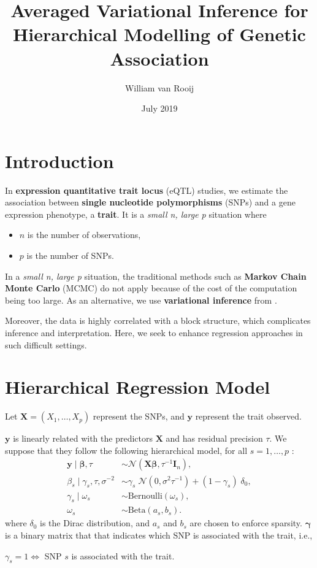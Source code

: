 \documentclass[portrait, a0, 30pt]{sciposter}
\author{William van Rooij}
\title{Averaged Variational Inference for Hierarchical Modelling of Genetic Association}
\date{July 2019}
\institute{École Polytechnique Fédérale de Lausanne, Lausanne, Switzerland}
\begin{document}
\maketitle
\begin{multicols*}{2}
\section{Introduction}
In \textbf{expression quantitative trait locus} (eQTL) studies, we estimate the association between \textbf{single nucleotide polymorphisms} (SNPs) and a gene expression phenotype, a \textbf{trait}. It is a \textit{small n, large p} situation where
\begin{itemize}
\item $n$ is the number of observations,
\item $p$ is the number of SNPs.
\end{itemize}
In a \textit{small n, large p} situation, the traditional methods such as \textbf{Markov Chain Monte Carlo} (MCMC) do not apply because of the cost of the computation being too large. As an alternative, we use \textbf{variational inference} from \citet{varInf}.

Moreover, the data is  highly correlated with a block structure, which complicates inference and interpretation. Here, we seek to enhance regression approaches in such difficult settings.



\section{Hierarchical Regression Model}
Let $\boldsymbol{X} = (X_1,\dots,X_p)$ represent the SNPs, and $\boldsymbol{y}$ represent the trait observed.

$\boldsymbol{y}$ is linearly related with the predictors $\boldsymbol{X}$ and has residual precision $\tau$. We suppose that they follow the following hierarchical model, for all $s = 1,\dots , p$ :
\begin{align*}
\boldsymbol{y} \mid \boldsymbol{\beta}, \tau &\sim\mathcal{N}\left(\boldsymbol{X\beta}, \tau^{-1}\boldsymbol{I}_n\right),\\
\beta_s \mid \gamma_s, \tau, \sigma^{-2} &\sim \gamma_s\;\mathcal{N} \left( 0, \sigma^2 \tau^{-1} \right) + (1-\gamma_s)\;\delta_0,\\
\gamma_s \mid \omega_s &\sim \mathrm{Bernoulli}\left(\omega_s\right),\\
\omega_s &\sim \mathrm{Beta}\left(a_s, b_s\right).
\end{align*}
where $\delta_0$ is the Dirac distribution, and $a_s$ and $b_s$ are chosen to enforce sparsity. $\boldsymbol{\gamma}$ is a binary matrix that that indicates which SNP is associated with the trait, i.e.,
\begin{center}
$\gamma_s = 1 \Longleftrightarrow$ SNP $ s $ is associated with the trait.
\end{center}

\end{multicols*}
\end{document}
